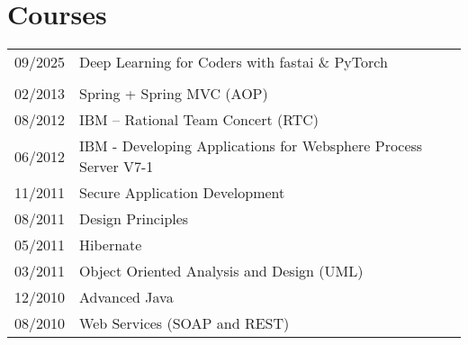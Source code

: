 \documentclass[2pt,a4paper]{article}
\newlength{\datecolumn}
\newlength{\textcolumn}
\begin{document}
\section*{Courses}
\begin{tabular}{p{\datecolumn} p{\textcolumn}}
09/2025 & Deep Learning for Coders with fastai \& PyTorch \\ \\
02/2013 & Spring + Spring MVC (AOP) \\
08/2012 & IBM – Rational Team Concert (RTC) \\
06/2012 & IBM - Developing Applications for Websphere Process Server V7-1 \\
11/2011 & Secure Application Development \\
08/2011 & Design Principles \\
05/2011 & Hibernate \\
03/2011 & Object Oriented Analysis and Design (UML) \\
12/2010 & Advanced Java \\
08/2010 & Web Services (SOAP and REST) \\
\end{tabular}
\end{document}

